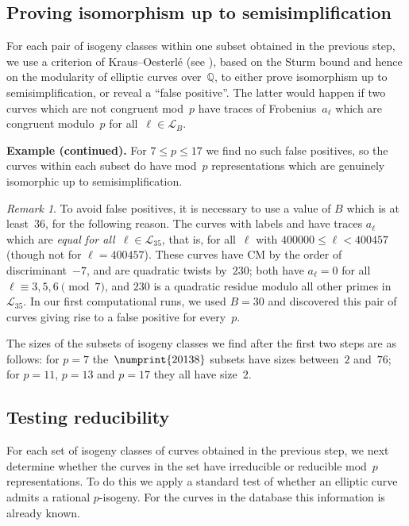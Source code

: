\documentclass[12pt]{amsart}
\newcommand{\lmfdbec}[3]{\href{http://www.lmfdb.org/EllipticCurve/Q/#1#2#3}{{\text{\rm#1#2#3}}}}
\newcommand{\Q}{\mathbb{Q}}
\newcommand{\calL}{\mathcal{L}}
\numberwithin{equation}{section}
\theoremstyle{definition}
\theoremstyle{remark}
\newtheorem{remark}[theorem]{Remark}
\begin{document}
\subsection{Proving isomorphism up to semisimplification}

For each pair of isogeny classes within one subset obtained in the
previous step, we use a criterion of Kraus--Oesterl\'e (see
\cite[Proposition~4]{KO}), based on the Sturm bound and hence on the
modularity of elliptic curves over~$\Q$, to either prove isomorphism
up to semisimplification, or reveal a ``false positive''.  The latter
would happen if two curves which are not congruent mod~$p$ have traces
of Frobenius~$a_{\ell}$ which are congruent modulo~$p$ for
all~$\ell\in\calL_B$.

{\bf Example (continued).}  For $7\le p\le17$ we find no such false
positives, so the curves within each subset do have mod~$p$
representations which are genuinely isomorphic up to
semisimplification.

\begin{remark}
  To avoid false positives, it is necessary to use a value of $B$
  which is at least~$36$, for the following reason.  The curves with
  labels \lmfdbec{25921}{a}{1} and \lmfdbec{78400}{gw}{1} have traces
  $a_{\ell}$ which are \emph{equal for all~$\ell\in\calL_{35}$}, that
  is, for all~$\ell$ with $400000\le \ell<400457$ (though not for
  $\ell=400457$).  These curves have CM by the order of
  discriminant~$-7$, and are quadratic twists by~$230$; both have
  $a_\ell=0$ for all $\ell\equiv3,5,6\pmod{7}$, and $230$ is a
  quadratic residue modulo all other primes in~$\calL_{35}$. In our
  first computational runs, we used $B=30$ and discovered this pair of
  curves giving rise to a false positive for every~$p$.
\end{remark}

The sizes of the subsets of isogeny classes we find after the first
two steps are as follows: for $p=7$ the~$\numprint{20138}$ subsets
have sizes between~$2$ and~$76$; for $p=11$, $p=13$ and $p=17$ they
all have size~$2$.


\subsection{Testing reducibility}
For each set of isogeny classes of curves obtained in the previous
step, we next determine whether the curves in the set have irreducible
or reducible mod~$p$ representations.  To do this we apply a standard
test of whether an elliptic curve admits a rational $p$-isogeny.  For
the curves in the database this information is already known.
\end{document}
